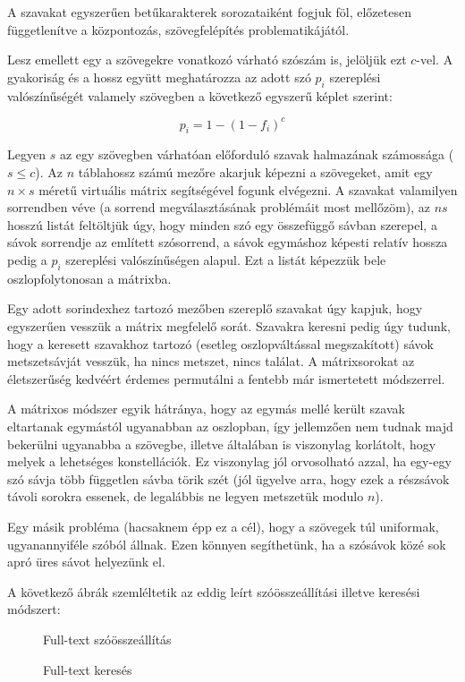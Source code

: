 \documentclass[
    parspace,
    noindent,
    nohyp,
]{elteiktdk}[2023/04/10]
\begin{document}
A szavakat egyszerűen betűkarakterek sorozataiként fogjuk föl,
előzetesen függetlenítve a központozás, szövegfelépítés problematikájától.

Lesz emellett egy a szövegekre vonatkozó várható szószám is, jelöljük ezt $c$-vel.
A gyakoriság és a hossz együtt meghatározza az adott szó
$p_i$ szereplési valószínűségét valamely szövegben a következő egyszerű képlet szerint:

$$
p_i = 1 - (1 - f_i)^c
$$

Legyen $s$ az egy szövegben várhatóan előforduló szavak halmazának számossága ($s \leq c$).
Az $n$ táblahossz számú mezőre akarjuk képezni a szövegeket,
amit egy $n \times s$ méretű virtuális mátrix segítségével fogunk elvégezni.
A szavakat valamilyen sorrendben véve (a sorrend megválasztásának problémáit most mellőzöm),
az $n s$ hosszú listát feltöltjük úgy, hogy minden szó egy összefüggő sávban szerepel,
a sávok sorrendje az említett szósorrend,
a sávok egymáshoz képesti relatív hossza pedig a $p_i$ szereplési valószínűségen alapul.
Ezt a listát képezzük bele oszlopfolytonosan a mátrixba.

Egy adott sorindexhez tartozó mezőben szereplő szavakat úgy kapjuk,
hogy egyszerűen vesszük a mátrix megfelelő sorát.
Szavakra keresni pedig úgy tudunk, hogy a keresett szavakhoz tartozó
(esetleg oszlopváltással megszakított) sávok metszetsávját vesszük,
ha nincs metszet, nincs találat.
A mátrixsorokat az életszerűség kedvéért érdemes permutálni a fentebb már ismertetett módszerrel.

A mátrixos módszer egyik hátránya,
hogy az egymás mellé került szavak eltartanak egymástól ugyanabban az oszlopban,
így jellemzően nem tudnak majd bekerülni ugyanabba a szövegbe,
illetve általában is viszonylag korlátolt,
hogy melyek a lehetséges konstellációk.
Ez viszonylag jól orvosolható azzal, ha egy-egy szó sávja több független sávba törik szét
(jól ügyelve arra, hogy ezek a részsávok távoli sorokra essenek,
de legalábbis ne legyen metszetük modulo $n$).

Egy másik probléma (hacsaknem épp ez a cél), hogy a szövegek túl uniformak, ugyanannyiféle szóból állnak.
Ezen könnyen segíthetünk, ha a szósávok közé sok apró üres sávot helyezünk el.

A következő ábrák szemléltetik az eddig leírt szóösszeállítási illetve keresési módszert:

\begin{figure}[H]
  \centering
  \hspace*{\fill}
  \begin{minipage}[t]{0.42\textwidth}
    
    \caption{Full-text szóösszeállítás}
  \end{minipage}
  \hspace*{\fill}
  \begin{minipage}[t]{0.42\textwidth}
    
    \caption{Full-text keresés}
  \end{minipage}
  \hspace*{\fill}
\end{figure}
\end{document}
